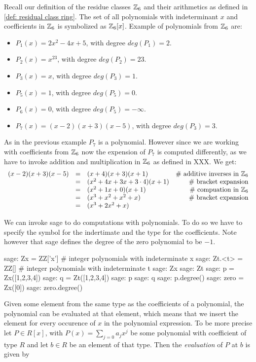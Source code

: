 \begin{example} Recall our definition of the residue classes $\mathbb{Z}_6$ and their arithmetics as defined in \ref{def: residual class ring}. The set of all polynomials with indeterminant $x$ and coefficients in $\mathbb{Z}_6$ is symbolized as $\mathbb{Z}_6[x]$. Example of polynomials from $\mathbb{Z}_6$ are:
\begin{itemize}
\item $P_1(x)= 2x^2 -4x +5$, with degree $deg(P_1)=2$.
\item $P_2(x)= x^{23}$, with degree $deg(P_2)=23$.
\item $P_3(x)= x$, with degree $deg(P_3)=1$.
\item $P_5(x)= 1$, with degree $deg(P_5)=0$.
\item $P_6(x)=0$, with degree $deg(P_5)=-\infty$.
\item $P_7(x)= (x-2)(x+3)(x-5)$, with degree $deg(P_3)=3$.
\end{itemize}
As in the previous example $P_7$ is a polynomial. However since we are working with coefficients from $\mathbb{Z}_6$ now the expension of $P_7$ is computed differently, as we have to invoke addition and multiplication in $\mathbb{Z}_6$ as defined in XXX. We get:
$$
\begin{array}{l c l r}
(x-2)(x+3)(x-5) & = & (x+4)(x+3)(x+1) & \text{\# additive inverses in } \mathbb{Z}_6 \\
                & = & (x^2+4x+3x+3\cdot 4)(x+1) & \text{\# bracket expansion} \\
                & = & (x^2+1x+0)(x+1) & \text{\# compuation in } \mathbb{Z}_6 \\
                & = & (x^3+x^2+x^2+x) & \text{\# bracket expansion}\\
                & = & (x^3+2x^2+x) &
\end{array} 
$$
\end{example}
We can invoke sage to do computations with polynomials. To do so we have to specify the symbol for the indertimate and the type for the coefficients. Note however that sage defines the degree of the zero polynomial to be $-1$.
\begin{sagecommandline}
sage: Zx = ZZ['x'] # integer polynomials with indeterminate x
sage: Zt.<t> = ZZ[] # integer polynomials with indeterminate t
sage: Zx
sage: Zt
sage: p = Zx([1,2,3,4])
sage: q = Zt([1,2,3,4])
sage: p
sage: q
sage: p.degree()
sage: zero = Zx([0])
sage: zero.degree()
\end{sagecommandline}
Given some element from the same type as the coefficients of a polynomial, the polynomial can be evaluated at that element, which means that we insert the element for every occurence of $x$ in the polynomial expression. To be more precise let $P\in R[x]$, with $P(x)=\sum_{j=0}a_j x^j$ be some polynomial with coefficient of type $R$ and let $b\in R$ be an element of that type. Then the \textit{evaluation} of $P$ at $b$ is given by
